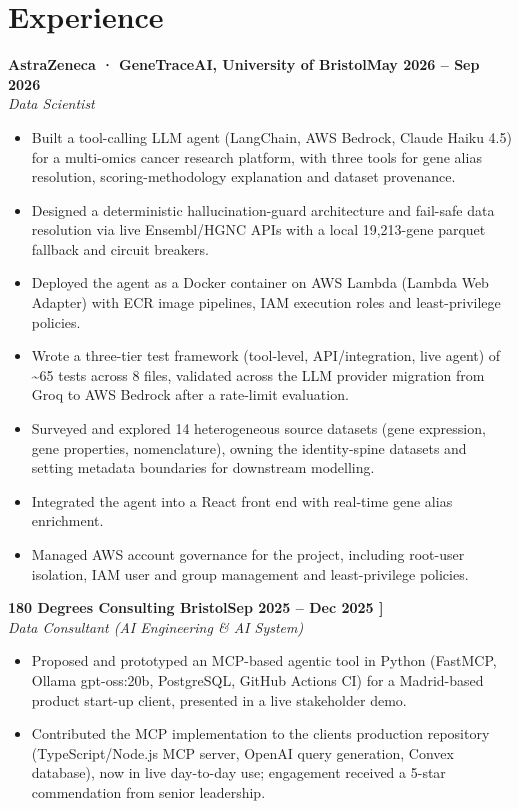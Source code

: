 \documentclass[a4paper,11pt]{article}
\newcommand{\entry}[4]{\needspace{4\baselineskip}\noindent\textbf{#1}\hfill\textbf{#2}\\ \textit{#3}\hfill\textit{#4}\par}
\begin{document}
\section{Experience}
\entry{AstraZeneca · GeneTraceAI, University of Bristol}{May 2026 – Sep 2026}{Data Scientist}{}
\begin{itemize}
  \item Built a tool-calling LLM agent (LangChain, AWS Bedrock, Claude Haiku 4.5) for a multi-omics cancer research platform, with three tools for gene alias resolution, scoring-methodology explanation and dataset provenance.
  \item Designed a deterministic hallucination-guard architecture and fail-safe data resolution via live Ensembl/HGNC APIs with a local 19,213-gene parquet fallback and circuit breakers.
  \item Deployed the agent as a Docker container on AWS Lambda (Lambda Web Adapter) with ECR image pipelines, IAM execution roles and least-privilege policies.
  \item Wrote a three-tier test framework (tool-level, API/integration, live agent) of \textasciitilde{}65 tests across 8 files, validated across the LLM provider migration from Groq to AWS Bedrock after a rate-limit evaluation.
  \item Surveyed and explored 14 heterogeneous source datasets (gene expression, gene properties, nomenclature), owning the identity-spine datasets and setting metadata boundaries for downstream modelling.
  \item Integrated the agent into a React front end with real-time gene alias enrichment.
  \item Managed AWS account governance for the project, including root-user isolation, IAM user and group management and least-privilege policies.
\end{itemize}
\vspace{4pt}
\entry{180 Degrees Consulting Bristol}{Sep 2025 – Dec 2025   ]}{Data Consultant (AI Engineering \& AI System)}{}
\begin{itemize}
  \item Proposed and prototyped an MCP-based agentic tool in Python (FastMCP, Ollama gpt-oss:20b, PostgreSQL, GitHub Actions CI) for a Madrid-based product start-up client, presented in a live stakeholder demo.
  \item Contributed the MCP implementation to the client\textquotesingle{}s production repository (TypeScript/Node.js MCP server, OpenAI query generation, Convex database), now in live day-to-day use; engagement received a 5-star commendation from senior leadership.
\end{itemize}
\end{document}
